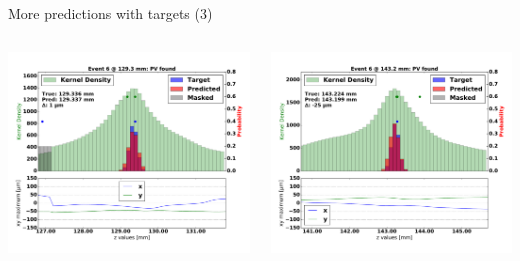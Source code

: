 \begin{frame}{More predictions with targets (3)}
  \begin{columns}[c]
        \begin{center}
           \includegraphics[width=1\textwidth, trim=60 0 60 0]{images/07Jan19_AltCNN4Layer_D35_sp_33.pdf}
        \end{center}
        \begin{center}
           \includegraphics[width=1\textwidth, trim=60 0 60 0]{images/07Jan19_AltCNN4Layer_D35_sp_34.pdf}
       \end{center}
  \end{columns}
\end{frame}


